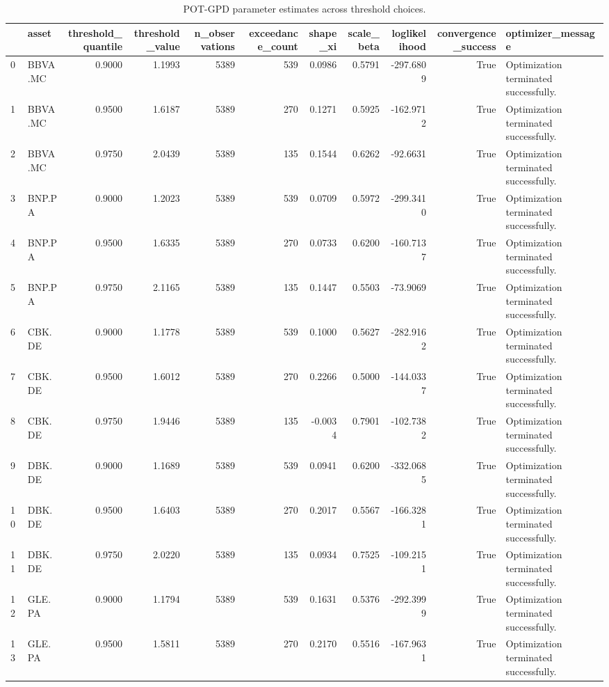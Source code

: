 \begin{table}
\caption{POT-GPD parameter estimates across threshold choices.}
\label{tab:evt_gpd_params_threshold_robustness}
\begin{tabular}{llrrrrrrrrl}
\toprule
 & asset & threshold_quantile & threshold_value & n_observations & exceedance_count & shape_xi & scale_beta & loglikelihood & convergence_success & optimizer_message \\
\midrule
0 & BBVA.MC & 0.9000 & 1.1993 & 5389 & 539 & 0.0986 & 0.5791 & -297.6809 & True & Optimization terminated successfully. \\
1 & BBVA.MC & 0.9500 & 1.6187 & 5389 & 270 & 0.1271 & 0.5925 & -162.9712 & True & Optimization terminated successfully. \\
2 & BBVA.MC & 0.9750 & 2.0439 & 5389 & 135 & 0.1544 & 0.6262 & -92.6631 & True & Optimization terminated successfully. \\
3 & BNP.PA & 0.9000 & 1.2023 & 5389 & 539 & 0.0709 & 0.5972 & -299.3410 & True & Optimization terminated successfully. \\
4 & BNP.PA & 0.9500 & 1.6335 & 5389 & 270 & 0.0733 & 0.6200 & -160.7137 & True & Optimization terminated successfully. \\
5 & BNP.PA & 0.9750 & 2.1165 & 5389 & 135 & 0.1447 & 0.5503 & -73.9069 & True & Optimization terminated successfully. \\
6 & CBK.DE & 0.9000 & 1.1778 & 5389 & 539 & 0.1000 & 0.5627 & -282.9162 & True & Optimization terminated successfully. \\
7 & CBK.DE & 0.9500 & 1.6012 & 5389 & 270 & 0.2266 & 0.5000 & -144.0337 & True & Optimization terminated successfully. \\
8 & CBK.DE & 0.9750 & 1.9446 & 5389 & 135 & -0.0034 & 0.7901 & -102.7382 & True & Optimization terminated successfully. \\
9 & DBK.DE & 0.9000 & 1.1689 & 5389 & 539 & 0.0941 & 0.6200 & -332.0685 & True & Optimization terminated successfully. \\
10 & DBK.DE & 0.9500 & 1.6403 & 5389 & 270 & 0.2017 & 0.5567 & -166.3281 & True & Optimization terminated successfully. \\
11 & DBK.DE & 0.9750 & 2.0220 & 5389 & 135 & 0.0934 & 0.7525 & -109.2151 & True & Optimization terminated successfully. \\
12 & GLE.PA & 0.9000 & 1.1794 & 5389 & 539 & 0.1631 & 0.5376 & -292.3999 & True & Optimization terminated successfully. \\
13 & GLE.PA & 0.9500 & 1.5811 & 5389 & 270 & 0.2170 & 0.5516 & -167.9631 & True & Optimization terminated successfully. \\

\end{tabular}
\end{table}
